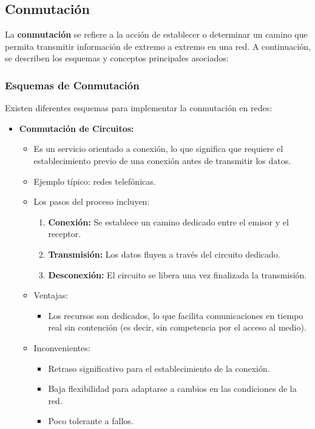 \documentclass[a4paper,12pt]{article}
\begin{document}
\subsection{Conmutación}

La \textbf{conmutación} se refiere a la acción de establecer o determinar un camino que permita transmitir información de extremo a extremo en una red. A continuación, se describen los esquemas y conceptos principales asociados:

\subsubsection*{Esquemas de Conmutación}

Existen diferentes esquemas para implementar la conmutación en redes:
\begin{itemize}
    \item \textbf{Conmutación de Circuitos:}
    \begin{itemize}
        \item Es un servicio orientado a conexión, lo que significa que requiere el establecimiento previo de una conexión antes de transmitir los datos.
        \item Ejemplo típico: redes telefónicas.
        \item Los pasos del proceso incluyen:
        \begin{enumerate}
            \item \textbf{Conexión:} Se establece un camino dedicado entre el emisor y el receptor.
            \item \textbf{Transmisión:} Los datos fluyen a través del circuito dedicado.
            \item \textbf{Desconexión:} El circuito se libera una vez finalizada la transmisión.
        \end{enumerate}
        \item Ventajas:
        \begin{itemize}
            \item Los recursos son dedicados, lo que facilita comunicaciones en tiempo real sin contención (es decir, sin competencia por el acceso al medio).
        \end{itemize}
        \item Inconvenientes:
        \begin{itemize}
            \item Retraso significativo para el establecimiento de la conexión.
            \item Baja flexibilidad para adaptarse a cambios en las condiciones de la red.
            \item Poco tolerante a fallos.
        \end{itemize}
    \end{itemize}


\end{itemize}
\end{document}
